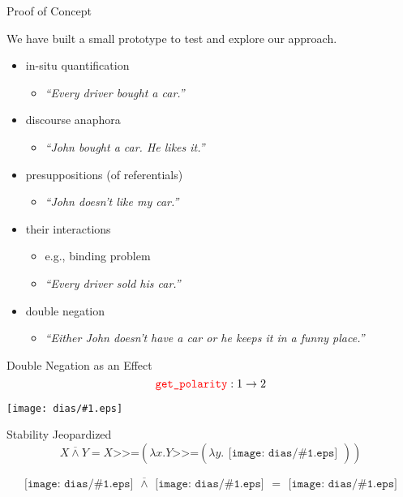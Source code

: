 \documentclass{beamer}
\newcommand{\mycolord}[1]{\textcolor{myColor2}{#1}}
\newcommand{\dand}{\mathbin{\overline{\land}}}
\newcommand{\hsbind}{\mathbin{\texttt{>>=}}}
\newcommand{\includepicturescale}[2]{
    \texttt{[image: dias/\#1.eps]}
}
\begin{document}
\begin{frame}{Proof of Concept}
  \vfill

  We have built a small prototype to test and explore our approach.
  
  \vfill
  \begin{itemize}
  \item in-situ quantification
    \begin{itemize}
    \item \textit{``Every driver bought a car.''}
    \end{itemize}
  \item discourse anaphora
    \begin{itemize}
    \item \textit{``John bought a car. He likes it.''}
    \end{itemize}
  \item presuppositions (of referentials)
    \begin{itemize}
    \item \textit{``John doesn't like my car.''}
    \end{itemize}
  \item their interactions
    \begin{itemize}
    \item e.g., binding problem
    \item \textit{``Every driver sold his car.''}
    \end{itemize}
  \vfill
  \pause
  \item \mycolord{double negation}
    \begin{itemize}
    \item \textit{``Either John doesn't have a car or he keeps it in a
      funny place.''}
    \end{itemize}
  \end{itemize}
\end{frame}

\begin{frame}{Double Negation as an Effect}
  $$\textcolor{red}{\texttt{get\_polarity}} : 1 \to 2$$
  \vfill
  \begin{center}
  \includepicturescale{double_negation}{0.4}
  \end{center}
\end{frame}

\begin{frame}{Stability Jeopardized}
  $$X \dand Y = X \hsbind \left(\lambda x. Y \hsbind \left(\lambda y. \begin{array}{l}\includepicturescale{conj}{0.5}\end{array}\right)\right)$$
  \vfill
  \begin{adjustbox}{center}
  $$\begin{array}{l}\includepicturescale{double_negation}{0.27}\end{array} \dand \begin{array}{l}\includepicturescale{A}{0.27}\end{array} = \begin{array}{l}\includepicturescale{double_negation_A}{0.27}\end{array}$$
  \end{adjustbox}
\end{frame}
\end{document}

